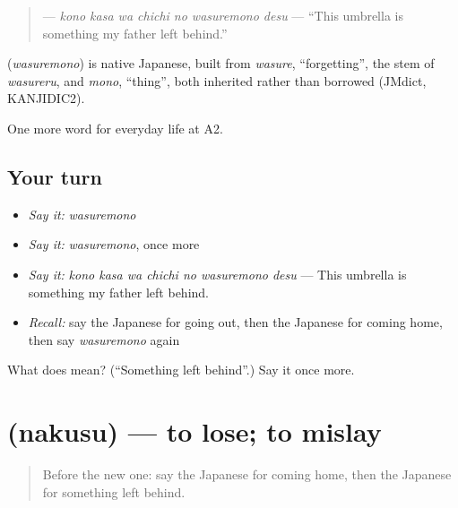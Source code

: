 \begin{quote}
\textbf{   } — \emph{kono kasa wa chichi no wasuremono desu} — \textquotedblleft{}This umbrella is something my father left behind.\textquotedblright{}
\end{quote}

\begin{cousinweb}
\textbf{} (\emph{wasuremono}) is native Japanese, built from \emph{wasure}, \textquotedblleft{}forgetting\textquotedblright{}, the stem of \emph{wasureru}, and \emph{mono}, \textquotedblleft{}thing\textquotedblright{}, both inherited rather than borrowed (JMdict, KANJIDIC2).
\end{cousinweb}

\begin{grammarlens}[title={What you've built}]
One more word for everyday life at A2.
\end{grammarlens}

\subsection*{Your turn}
\begin{itemize}
\raggedright
  \item \emph{Say it:} \emph{wasuremono}
  \item \emph{Say it:} \emph{wasuremono}, once more
  \item \emph{Say it:} \emph{kono kasa wa chichi no wasuremono desu} — This umbrella is something my father left behind.
  \item \emph{Recall:} say the Japanese for going out, then the Japanese for coming home, then say \emph{wasuremono} again
\end{itemize}

\begin{tcolorbox}[breakable,colback=teal!4,colframe=teal!35!black,title={Before you move on}]
What does  mean? (\textquotedblleft{}Something left behind\textquotedblright{}.) Say it once more.
\end{tcolorbox}
\section[\texorpdfstring{\ja{なくす} (nakusu)}{なくす (nakusu)}]{ (nakusu) — to lose; to mislay}

\label{lesson:JA-C153-nakusu}



\begin{quote}
Before the new one: say the Japanese for coming home, then the Japanese for something left behind.
\end{quote}

